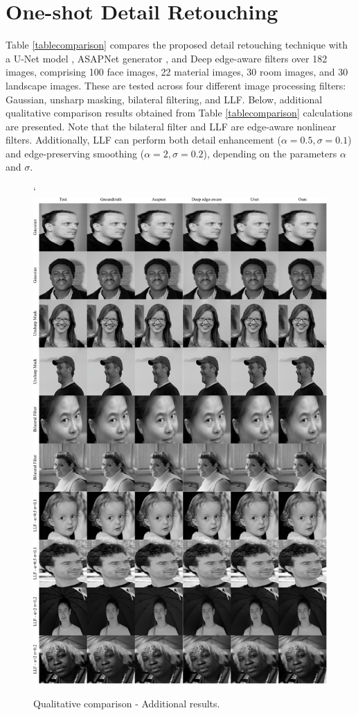 \chapter{One-shot Detail Retouching}
\label{one-shot-add}
Table \ref{tablecomparison} compares the proposed detail retouching technique with a U-Net model \cite{ronneberger2015u}, ASAPNet generator \cite{shaham2021spatially}, and Deep edge-aware filters \cite{xu2015deep} over 182 images, comprising 100 face images, 22 material images, 30 room images, and 30 landscape images. These are tested across four different image processing filters: Gaussian, unsharp masking, bilateral filtering, and \gls{LLF}. Below, additional qualitative comparison results obtained from Table \ref{tablecomparison} calculations are presented. Note that the bilateral filter and \gls{LLF} are edge-aware nonlinear filters. Additionally, \gls{LLF} can perform both detail enhancement ($\alpha=0.5, \sigma=0.1$) and edge-preserving smoothing ($\alpha=2, \sigma=0.2$), depending on the parameters $\alpha$ and $\sigma$.


\begin{figure}[ht]
  \centering
  {`\includegraphics[width=0.8\linewidth]{Chapters/appendix-figs/face.pdf}}

   \caption{Qualitative comparison - Additional results.}
   \label{fig:appendix-DR-face}
\end{figure}

